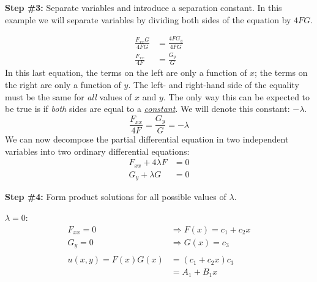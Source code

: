 \noindent\textbf{Step \#3:} Separate variables and introduce a separation constant.  In this example we will separate variables by dividing both sides of the equation by $4FG$.

\begin{align*}
\frac{F_{xx} G}{4FG} &= \frac{4FG_y}{4FG} \\
\frac{F_{xx}}{4F} &= \frac{G_y}{G}
\end{align*}
In this last equation, the terms on the left are only a function of $x$; the terms on the right are only a function of $y$.  The left- and right-hand side of the equality must be the same for \emph{all} values of $x$ and $y$.  The only way this can be expected to be true is if \emph{both} sides are equal to a \emph{\underline{constant}}.  We will denote this constant: $-\lambda$.
\begin{equation*}
\frac{F_{xx}}{4F} = \frac{G_y}{G} = -\lambda 
\end{equation*}
We can now decompose the partial differential equation in two independent variables into two ordinary differential equations:
\begin{align*}
F_{xx} + 4\lambda F &= 0 \\
G_y + \lambda G &= 0
\end{align*}

\vspace{0.5cm}

\noindent\textbf{Step \#4:} Form product solutions for all possible values of $\lambda$.

\vspace{0.25cm}

\noindent\underline{$\lambda = 0$}:
\begin{align*}
F_{xx} = 0 &\Rightarrow F(x) = c_1 + c_2x \\
G_y = 0 &\Rightarrow G(x) = c_3 \\
& \\
u(x,y) = F(x)G(x) &= \left(c_1 + c_2x\right) c_3 \\
 &= A_1 + B_1 x
\end{align*}

